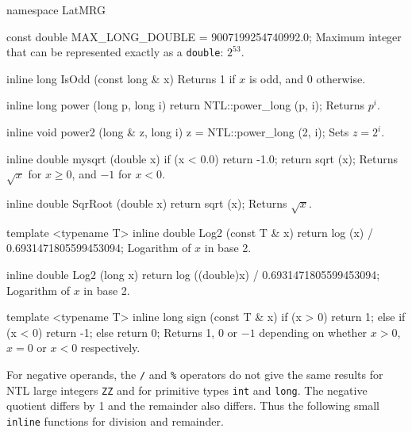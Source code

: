 namespace LatMRG {

const double MAX_LONG_DOUBLE = 9007199254740992.0;
\endcode
\tab
Maximum integer that can be represented exactly as a
  \texttt{double}: $2^{53}$.
\endtab


\code

inline long IsOdd (const long & x) \endhide
\endcode
\tab
Returns 1 if $x$ is odd, and 0 otherwise.
\endtab



\code

inline long power (long p, long i) \hide
{
   return NTL::power_long (p, i);
}
\endhide
\endcode
\tab
Returns $p^i$.
\endtab
\code


inline void power2 (long & z, long i) \hide
{
   z = NTL::power_long (2, i);
}
\endhide
\endcode
\tab
Sets $z = 2^i$.
\endtab
\code


inline double mysqrt (double x) \hide
{
    if (x < 0.0)
       return -1.0;
    return sqrt (x);
}
\endhide
\endcode
\tab
Returns $\sqrt{x}$ for $x\ge 0$, and $-1$ for $x < 0$.
\endtab
\code


inline double SqrRoot (double x) \hide
{
    return sqrt (x);
}
\endhide
\endcode
\tab
Returns $\sqrt{x}$. 
\endtab
\code


template <typename T>
inline double Log2 (const T & x)\hide
{
   return log (x) / 0.6931471805599453094;
}
\endhide
\endcode
\tab
Logarithm of $x$ in base 2.
\endtab
\code


inline double Log2 (long x)\hide
{
   return log ((double)x) / 0.6931471805599453094;
}
\endhide
\endcode
\tab
Logarithm of $x$ in base 2.
\endtab
\code


template <typename T>
inline long sign (const T & x)\hide
{
    if (x > 0) return 1; else if (x < 0) return -1; else return 0;
}
\endhide
\endcode
\tab
Returns 1, 0 or $-1$ depending on whether $x> 0$, $x= 0$ or $x< 0$
  respectively.
\endtab



For negative operands, the \texttt{/} and \texttt{\%} operators do not give the
same results for NTL large integers \texttt{ZZ} and for primitive types
\texttt{int} and \texttt{long}. The negative quotient differs by 1 and the
remainder also differs.
Thus the following small \texttt{inline} functions for division and remainder.
\code


}
